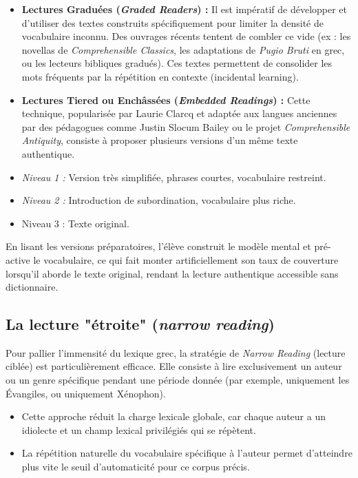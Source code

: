 {\begin{itemize}\item \textbf{Lectures Graduées (\textit{Graded Readers}) :} Il est impératif de développer et d'utiliser des textes construits spécifiquement pour limiter la densité de vocabulaire inconnu. Des ouvrages récents tentent de combler ce vide (ex : les novellas de \textit{Comprehensible Classics}, les adaptations de \textit{Pugio Bruti} en grec, ou les lecteurs bibliques gradués).\cite{II-3-2-ref52} Ces textes permettent de consolider les mots fréquents par la répétition en contexte (incidental learning).\item \textbf{Lectures \og Tiered\fg{} ou Enchâssées (\textit{Embedded Readings}) :} Cette technique, popularisée par Laurie Clarcq et adaptée aux langues anciennes par des pédagogues comme Justin Slocum Bailey ou le projet \textit{Comprehensible Antiquity}, consiste à proposer plusieurs versions d'un même texte authentique.\item \textit{Niveau 1 :} Version très simplifiée, phrases courtes, vocabulaire restreint.\item \textit{Niveau 2 :} Introduction de subordination, vocabulaire plus riche.\item Niveau 3 : Texte original.\end{itemize}En lisant les versions préparatoires, l'élève construit le modèle mental et pré-active le
vocabulaire, ce qui fait monter artificiellement son taux de couverture lorsqu'il aborde le texte
original, rendant la lecture \og authentique\fg{} accessible sans dictionnaire.\cite{II-3-2-ref54}



\subsection{La lecture "étroite" (\textit{narrow reading})}

Pour pallier l'immensité du lexique grec, la stratégie de \textit{Narrow Reading} (lecture ciblée)
est particulièrement efficace. Elle consiste à lire exclusivement un auteur ou un genre spécifique
pendant une période donnée (par exemple, uniquement les Évangiles, ou uniquement Xénophon).

\begin{itemize}\item Cette approche réduit la charge lexicale globale, car chaque auteur a un idiolecte et un champ lexical privilégiés qui se répètent.\item La répétition naturelle du vocabulaire spécifique à l'auteur permet d'atteindre plus vite le seuil d'automaticité pour ce corpus précis.\cite{II-3-2-ref57}\end{itemize}

}
